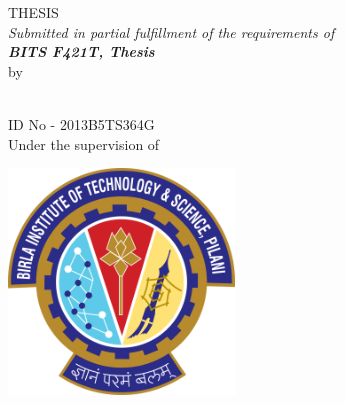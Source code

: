 \documentclass[
11pt, %
oneside, %
english, %
doublespacing, %
headsepline, %
]{MastersDoctoralThesis} %
\author{Rohit H Navarathna} %
\begin{document}
\frontmatter %

\pagestyle{plain} %

\newcommand{\JJ}{Josephson Junction }
\newcommand{\CPB}{Cooper Pair Box }


\begin{titlepage}
\begin{center}
\HRule \\[0.4cm] %
{\huge \bfseries \ttitle\par}\vspace{0.4cm} %
\HRule \\[1.5cm] %

\textsc{\Large THESIS}\\[0.5cm] %
\large \textit{Submitted in partial fulfillment of the requirements of\\\textbf{BITS F421T, Thesis}}\\[0.3cm] %
by\vspace{0.5cm}


\Large{\authorname}\\%
ID No - 2013B5TS364G\\\vspace{1.5cm}
\large Under the supervision of\\\vspace{0.5cm}
\Large{\supname} %
 
\vfill
\includegraphics[width=6cm]{Figures/Logo.png}\\ %
{\scshape\LARGE \textbf{\univname}\par}\vspace{1.5cm} %
\vfill
\end{center}
\end{titlepage}
\end{document}
